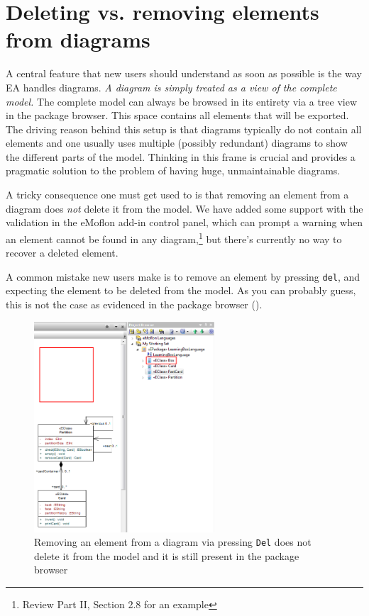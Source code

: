 \section{Deleting vs. removing elements from diagrams} 

A central feature that new users should understand as soon as possible is the way EA handles diagrams. \emph{A diagram is simply treated as a \emph{view} of the
complete model.} The complete model can always be browsed in its entirety via a tree view in the package browser. This space contains all elements that will be
exported. The driving reason behind this setup is that diagrams typically do not contain all elements and one usually uses multiple (possibly redundant)
diagrams to show the different parts of the model. Thinking in this frame is crucial and provides a pragmatic solution to the problem of having huge,
unmaintainable diagrams.

A tricky consequence one must get used to is that removing an element from a diagram does \emph{not} delete it from the model. We have added some support
with the validation in the eMoflon add-in control panel, which can prompt a warning when an element cannot be found in any diagram,\footnote{Review Part II,
Section 2.8 for an example} but there's currently no way to recover a deleted element.

A common mistake new users make is to remove an element by pressing \texttt{del}, and expecting the element to be deleted from the model. As you can probably
guess, this is not the case as evidenced in the package browser ().

\vspace{0.5cm}

\begin{figure}[htbp]
\begin{center} 
\includegraphics[width=0.6\textwidth]{../../org.moflon.doc.handbook.05_miscellaneous/1_grokkingEA/03_delVSRem/ea_partiallyDeleted}
  \caption{Removing an element from a diagram via pressing \texttt{Del} does not delete it from the model and it is still present in the package browser}  
    \label{ea:partiallyDeleted}
\end{center}
\end{figure}  

